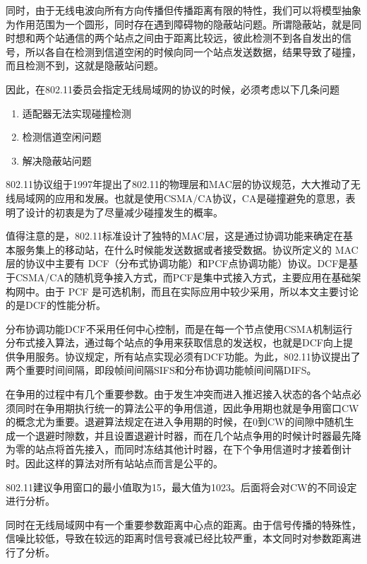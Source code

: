 \documentclass{article}
\begin{document}
同时，由于无线电波向所有方向传播但传播距离有限的特性，我们可以将模型抽象为作用范围为一个圆形，同时存在遇到障碍物的隐蔽站问题。所谓隐蔽站，就是同时想和两个站通信的两个站点之间由于距离比较远，彼此检测不到各自发出的信号，所以各自在检测到信道空闲的时候向同一个站点发送数据，结果导致了碰撞，而且检测不到，这就是隐蔽站问题。

因此，在802.11委员会指定无线局域网的协议的时候，必须考虑以下几条问题

\begin{enumerate}
	
	\item {适配器无法实现碰撞检测}
	\item {检测信道空闲问题}
	\item {解决隐蔽站问题}
	
\end{enumerate}

802.11协议组于1997年提出了802.11的物理层和MAC层的协议规范，大大推动了无线局域网的应用和发展。也就是使用CSMA/CA协议，CA是碰撞避免的意思，表明了设计的初衷是为了尽量减少碰撞发生的概率。

值得注意的是，802.11标准设计了独特的MAC层，这是通过协调功能来确定在基本服务集上的移动站，在什么时候能发送数据或者接受数据。协议所定义的 MAC 层的协议中主要有 DCF（分布式协调功能）和PCF点协调功能）协议。DCF是基于CSMA/CA的随机竞争接入方式，而PCF是集中式接入方式，主要应用在基础架构网中。由于 PCF 是可选机制，而且在实际应用中较少采用，所以本文主要讨论的是DCF的性能分析。

分布协调功能DCF不采用任何中心控制，而是在每一个节点使用CSMA机制运行分布式接入算法，通过每个站点的争用来获取信息的发送权，也就是DCF向上提供争用服务。协议规定，所有站点实现必须有DCF功能。为此，802.11协议提出了两个重要时间间隔，即段帧间间隔SIFS和分布协调功能帧间间隔DIFS。

在争用的过程中有几个重要参数。由于发生冲突而进入推迟接入状态的各个站点必须同时在争用期执行统一的算法公平的争用信道，因此争用期也就是争用窗口CW的概念尤为重要。退避算法规定在进入争用期的时候，在0到CW的间隙中随机生成一个退避时隙数，并且设置退避计时器，而在几个站点争用的时候计时器最先降为零的站点将首先接入，而同时冻结其他计时器，在下个争用信道时才接着倒计时。因此这样的算法对所有站站点而言是公平的。

802.11建议争用窗口的最小值取为15，最大值为1023。后面将会对CW的不同设定进行分析。

同时在无线局域网中有一个重要参数距离中心点的距离。由于信号传播的特殊性，信噪比较低，导致在较远的距离时信号衰减已经比较严重，本文同时对参数距离进行了分析。
\end{document}
